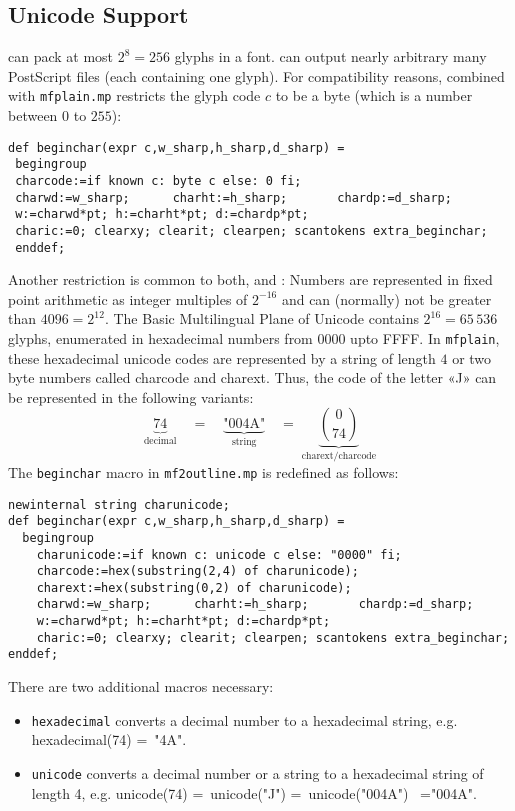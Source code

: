 \documentclass{scrartcl}
\begin{document}
\subsection{Unicode Support}
%
\MF{} can pack at most $2^{8}=256$ glyphs in a font. \MP{} can output nearly arbitrary many PostScript files (each containing one glyph). For compatibility reasons, \MP{} combined with \texttt{mfplain.mp} restricts the glyph code $c$ to be a byte (which is a number between $0$ to $255$):
\lstset{language=MetaPost,columns=fullflexible}
\begin{lstlisting}
def beginchar(expr c,w_sharp,h_sharp,d_sharp) =
 begingroup
 charcode:=if known c: byte c else: 0 fi;
 charwd:=w_sharp;      charht:=h_sharp;       chardp:=d_sharp;
 w:=charwd*pt; h:=charht*pt; d:=chardp*pt;
 charic:=0; clearxy; clearit; clearpen; scantokens extra_beginchar;
 enddef;
\end{lstlisting}
%
Another restriction is common to both, \MF{} and \MP: Numbers are represented in fixed point arithmetic as integer multiples of $2^{-16}$ and can (normally) not be greater than $4096=2^{12}$. The Basic Multilingual Plane of Unicode contains $2^{16}=65\,536$ glyphs, enumerated in hexadecimal numbers from 0000 upto FFFF. In \texttt{mfplain}, these  hexadecimal unicode codes are represented by a string of length $4$ or two byte numbers called charcode and charext. Thus, the code of the letter «J» can be represented in the following variants:
\[
	\underbrace{74}_{\text{decimal}}\quad=\quad\underbrace{\text{"004A"}}_{\text{string}}\quad=\;\underbrace{\binom{0}{74}}_{\text{charext/charcode}}
\]
The \texttt{beginchar} macro in \texttt{mf2outline.mp} is redefined as follows:
\lstset{language=MetaPost,columns=fullflexible}
\begin{lstlisting}
newinternal string charunicode;
def beginchar(expr c,w_sharp,h_sharp,d_sharp) =
  begingroup
    charunicode:=if known c: unicode c else: "0000" fi; 
    charcode:=hex(substring(2,4) of charunicode); 
    charext:=hex(substring(0,2) of charunicode); 
    charwd:=w_sharp;      charht:=h_sharp;       chardp:=d_sharp;
    w:=charwd*pt; h:=charht*pt; d:=chardp*pt;
    charic:=0; clearxy; clearit; clearpen; scantokens extra_beginchar;
enddef;
\end{lstlisting}
%
There are two additional macros necessary:
\begin{itemize}
	\item \texttt{hexadecimal} converts a decimal number to a hexadecimal string, e.g. hexadecimal(74) =~"4A".
	\item \texttt{unicode} converts a decimal number or a string to a hexadecimal string of length 4, e.g. unicode(74) =~unicode("J") =~unicode("004A") ~="004A".
\end{itemize}
\end{document}

